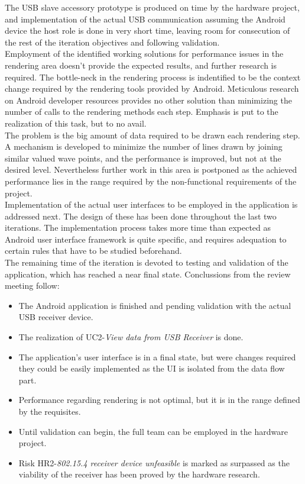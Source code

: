 			The USB slave accessory prototype is produced on time by the hardware project, and implementation of the actual USB communication assuming the Android device the host role is done in very short time, leaving room for consecution of the rest of the iteration objectives and following validation.\\

			Employment of the identified working solutions for performance issues in the rendering area doesn't provide the expected results, and further research is required. The bottle-neck in the rendering process is indentified to be the context change required by the rendering tools provided by Android. Meticulous research on Android developer resources provides no other solution than minimizing the number of calls to the rendering methods each step. Emphasis is put to the realization of this task, but to no avail.\\

			The problem is the big amount of data required to be drawn each rendering step. A mechanism is developed to minimize the number of lines drawn by joining similar valued wave points, and the performance is improved, but not at the desired level. Nevertheless further work in this area is postponed as the achieved performance lies in the range required by the non-functional requirements of the project.\\

			Implementation of the actual user interfaces to be employed in the application is addressed next. The design of these has been done throughout the last two iterations. The implementation process takes more time than expected as	Android user interface framework is quite specific, and requires adequation to certain rules that have to be studied beforehand.\\

			The remaining time of the iteration is devoted to testing and validation of the application, which has reached a near final state. Conclussions from the review meeting follow:
			\begin{itemize}
				\item The Android application is finished and pending validation with the actual USB receiver device.
				\item The realization of UC2-\emph{View data from USB Receiver} is done.
				\item The application's user interface is in a final state, but were changes required they could be easily implemented as the UI is isolated from the data flow part.
				\item Performance regarding rendering is not optimal, but it is in the range defined by the requisites.
				\item Until validation can begin, the full team can be employed in the hardware project.
				\item Risk HR2-\emph{802.15.4 receiver device unfeasible} is marked as surpassed as the viability of the receiver has been proved by the hardware research.
			\end{itemize}

